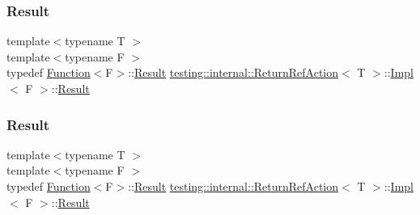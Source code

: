 \subsubsection{\texorpdfstring{Result}{Result}\hspace{0.1cm}{\footnotesize\ttfamily [1/3]}}
{\footnotesize\ttfamily template$<$typename T $>$ \\
template$<$typename F $>$ \\
typedef \mbox{\hyperlink{structtesting_1_1internal_1_1_function}{Function}}$<$F$>$\+::\mbox{\hyperlink{classtesting_1_1_action_interface_a7477de2fe3e4e01c59db698203acaee7}{Result}} \mbox{\hyperlink{classtesting_1_1internal_1_1_return_ref_action}{testing\+::internal\+::\+Return\+Ref\+Action}}$<$ T $>$\+::\mbox{\hyperlink{classtesting_1_1internal_1_1_return_ref_action_1_1_impl}{Impl}}$<$ F $>$\+::\mbox{\hyperlink{classtesting_1_1_action_interface_a7477de2fe3e4e01c59db698203acaee7}{Result}}}

\mbox{\label{classtesting_1_1internal_1_1_return_ref_action_1_1_impl_a9d55719e344507c0579150cdf307c8bc}} 
\subsubsection{\texorpdfstring{Result}{Result}\hspace{0.1cm}{\footnotesize\ttfamily [2/3]}}
{\footnotesize\ttfamily template$<$typename T $>$ \\
template$<$typename F $>$ \\
typedef \mbox{\hyperlink{structtesting_1_1internal_1_1_function}{Function}}$<$F$>$\+::\mbox{\hyperlink{classtesting_1_1_action_interface_a7477de2fe3e4e01c59db698203acaee7}{Result}} \mbox{\hyperlink{classtesting_1_1internal_1_1_return_ref_action}{testing\+::internal\+::\+Return\+Ref\+Action}}$<$ T $>$\+::\mbox{\hyperlink{classtesting_1_1internal_1_1_return_ref_action_1_1_impl}{Impl}}$<$ F $>$\+::\mbox{\hyperlink{classtesting_1_1_action_interface_a7477de2fe3e4e01c59db698203acaee7}{Result}}}

\mbox{\label{classtesting_1_1internal_1_1_return_ref_action_1_1_impl_a9d55719e344507c0579150cdf307c8bc}} 
